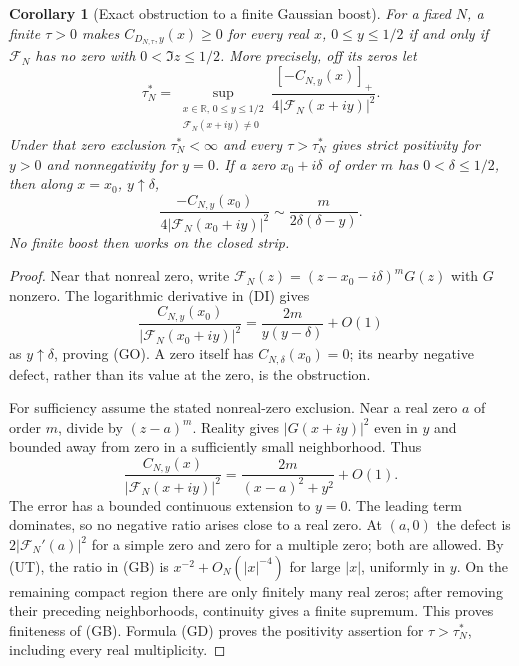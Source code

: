 \documentclass[11pt]{article}
\newtheorem{corollary}[theorem]{Corollary}
\theoremstyle{remark}\newtheorem{remark}[theorem]{Remark}
\newcommand{\R}{\mathbb R}
\begin{document}
\begin{corollary}[Exact obstruction to a finite Gaussian boost]
\label{cor:gaussian-threshold}
For a fixed $N$, a finite $\tau>0$ makes
$C_{D_{N,\tau},y}(x)\ge0$ for every real $x$, $0\le y\le1/2$
if and only if $\mathcal F_N$ has no zero with $0<\Im z\le1/2$.
More precisely, off its zeros let
\[
 \tau_N^*=\sup_{\substack{x\in\R,\,0\le y\le1/2\\
                         \mathcal F_N(x+iy)\ne0}}
       \frac{[-C_{N,y}(x)]_+}{4|\mathcal F_N(x+iy)|^2}.    \tag{GB}
\]
Under that zero exclusion $\tau_N^*<\infty$ and every
$\tau>\tau_N^*$ gives strict positivity for $y>0$ and
nonnegativity for $y=0$. If a zero $x_0+i\delta$ of order $m$
has $0<\delta\le1/2$, then along $x=x_0$, $y\uparrow\delta$,
\[
 \frac{-C_{N,y}(x_0)}{4|\mathcal F_N(x_0+iy)|^2}
                    \sim\frac{m}{2\delta(\delta-y)}.      \tag{GO}
\]
No finite boost then works on the closed strip.
\end{corollary}
\begin{proof}
Near that nonreal zero, write
$\mathcal F_N(z)=(z-x_0-i\delta)^mG(z)$ with $G$ nonzero.
The logarithmic derivative in (DI) gives
\[
 \frac{C_{N,y}(x_0)}{|\mathcal F_N(x_0+iy)|^2}
          =\frac{2m}{y(y-\delta)}+O(1)
\]
as $y\uparrow\delta$, proving (GO). A zero itself has
$C_{N,\delta}(x_0)=0$; its nearby negative defect,
rather than its value at the zero, is the obstruction.

For sufficiency assume the stated nonreal-zero exclusion.
Near a real zero $a$ of order $m$, divide by $(z-a)^m$.
Reality gives $|G(x+iy)|^2$ even in $y$ and bounded away from
zero in a sufficiently small neighborhood. Thus
\[
 \frac{C_{N,y}(x)}{|\mathcal F_N(x+iy)|^2}
           =\frac{2m}{(x-a)^2+y^2}+O(1).
\]
The error has a bounded continuous extension to $y=0$.
The leading term dominates, so no negative ratio arises close
to a real zero. At $(a,0)$ the defect is $2|\mathcal F_N'(a)|^2$
for a simple zero and zero for a multiple zero; both are allowed.
By (UT), the ratio in (GB) is $x^{-2}+O_N(|x|^{-4})$ for large
$|x|$, uniformly in $y$. On the remaining compact region there
are only finitely many real zeros; after removing their preceding
neighborhoods, continuity gives a finite supremum.
This proves finiteness of (GB). Formula (GD) proves the positivity
assertion for $\tau>\tau_N^*$, including every real multiplicity.
\end{proof}
\end{document}
